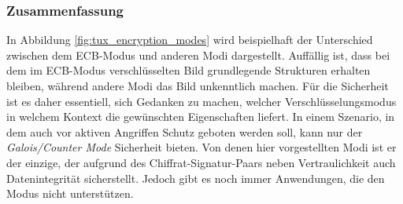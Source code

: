 \subsubsection{Zusammenfassung}
In Abbildung \ref{fig:tux_encryption_modes} wird beispielhaft der Unterschied zwischen dem ECB-Modus und anderen Modi dargestellt. Auffällig ist, dass bei dem im ECB-Modus verschlüsselten Bild grundlegende Strukturen erhalten bleiben, während andere Modi das Bild unkenntlich machen. Für die Sicherheit ist es daher essentiell, sich Gedanken zu machen, welcher Verschlüsselungsmodus in welchem Kontext die gewünschten Eigenschaften liefert. In einem Szenario, in dem auch vor aktiven Angriffen Schutz geboten werden soll,
kann nur der \textit{Galois/Counter Mode} Sicherheit bieten. Von denen hier vorgestellten Modi ist er der einzige, der aufgrund des Chiffrat-Signatur-Paars neben Vertraulichkeit auch Datenintegrität sicherstellt. Jedoch gibt es noch immer Anwendungen, die den Modus
nicht unterstützen.
